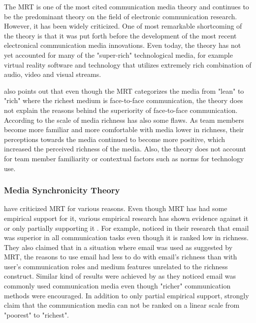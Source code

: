\documentclass[english,12pt,a4paper,pdftex]{article}
\begin{document}
The \ac{MRT} is one of the most cited communication media theory and continues to be the predominant theory on the field of electronic communication research. However, it has been widely criticized. One of most remarkable shortcoming of the theory is that it was put forth before the development of the most recent electronical communication media innovations. Even today, the theory has not yet accounted for many of the "super-rich" technological media, for example virtual reality software and technology that utilizes extremely rich combination of audio, video and visual streams. \citep{derosa2004}

\citet{derosa2004} also points out that even though the \ac{MRT} categorizes the media from "lean" to "rich" where the richest medium is face-to-face communication, the theory does not explain the reasons behind the superiority of face-to-face communication. According to \citet{derosa2004} the scale of media richness has also some flaws. As team members become more familiar and more comfortable with media lower in richness, their perceptions towards the media continued to become more positive, which increased the perceived richness of the media. Also, the theory does not account for team member familiarity or contextual factors such as norms for technology use.

\subsubsection{Media Synchronicity Theory}

\citet{dennis1999} have criticized MRT for various reasons. Even though MRT has had some empirical support for it, various empirical research has shown evidence against it or only partially supporting it \citep{dennis1998} \citep{elshinnawy1997}. For example, \citet{elshinnawy1997} noticed in their research that email was superior in all communication tasks even though it is ranked low in richness. They also claimed that in a situation where email was used as suggested by MRT, the reasons to use email had less to do with email's richness than with user's communication roles and medium features unrelated to the richness construct. Similar kind of results were achieved by \citet{korkala2006} as they noticed email was commonly used communication media even though "richer" communication methods were encouraged. In addition to only partial empirical support, \citet{dennis1999} strongly claim that the communication media can not be ranked on a linear scale from "poorest" to "richest".
\end{document}
